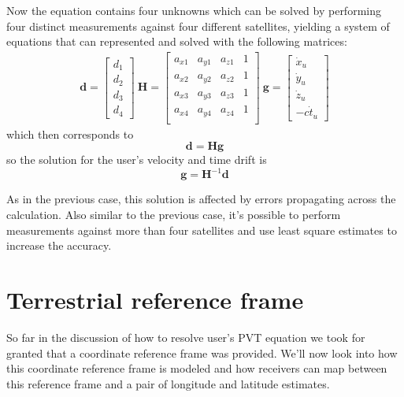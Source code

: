 Now the equation contains four unknowns which can be solved by performing four
distinct measurements against four different satellites, yielding a system of
equations that can represented and solved with the following matrices:
\[
  \begin{array}{l}
    \bm{d} = \begin{bmatrix}
    d_1 \\ d_2 \\ d_3 \\ d_4
  \end{bmatrix}

  \>

  \bm{H} = \begin{bmatrix}
    a_{x1} & a_{y1} & a_{z1} & 1 \\
    a_{x2} & a_{y2} & a_{z2} & 1 \\
    a_{x3} & a_{y3} & a_{z3} & 1 \\
    a_{x4} & a_{y4} & a_{z4} & 1 \\
  \end{bmatrix}

  \>

  \bm{g} = \begin{bmatrix}
    \dot x_u \\
    \dot y_u \\
    \dot z_u \\
    -c \dot t_u
  \end{bmatrix}
  \end{array}
\]
which then corresponds to
\begin{equation}
  \bm{d} = \bm{H} \bm{g}
\end{equation}
so the solution for the user's velocity and time drift is
\begin{equation}
  \bm{g} = \bm{H}^{-1} \bm{d}
\end{equation}

As in the previous case, this solution is affected by errors propagating across
the calculation. Also similar to the previous case, it's possible to perform
measurements against more than four satellites and use least square estimates to
increase the accuracy.

\section{Terrestrial reference frame}
So far in the discussion of how to resolve user's PVT equation we took for
granted that a coordinate reference frame was provided. We'll now look into how
this coordinate reference frame is modeled and how receivers can map between
this reference frame and a pair of longitude and latitude estimates.

